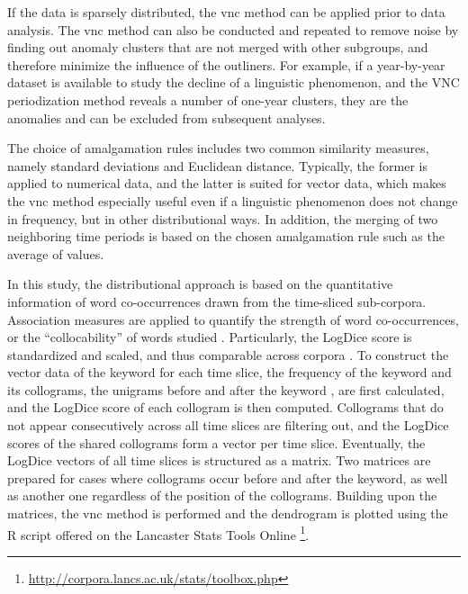 If the data is sparsely distributed, the \gls{vnc} method can be applied prior to data analysis. The \gls{vnc} method can also be conducted and repeated to remove noise by finding out anomaly clusters that are not merged with other subgroups, and therefore minimize the influence of the outliners. For example, if a year-by-year dataset is available to study the decline of a linguistic phenomenon, and the VNC periodization method reveals a number of one-year clusters, they are the anomalies and can be excluded from subsequent analyses.

The choice of amalgamation rules includes two common similarity measures, namely standard deviations and Euclidean distance. Typically, the former is applied to numerical data, and the latter is suited for vector data, which makes the \gls{vnc} method especially useful even if a linguistic phenomenon does not change in frequency, but in other distributional ways. In addition, the merging of two neighboring time periods is based on the chosen amalgamation rule such as the average of values.

In this study, the distributional approach is based on the quantitative information of word co-occurrences drawn from the time-sliced sub-corpora. Association measures are applied to quantify the strength of word co-occurrences, or the ``collocability'' of words studied \parencite{gablasova2017collocations}. Particularly, the LogDice score is standardized and scaled, and thus comparable across corpora \parencite{rychly2008lexicographer,gablasova2017collocations}. To construct the vector data of the keyword \jia for each time slice, the frequency of the keyword and its collograms, the unigrams before and after the keyword \parencite{gablasova2017collocations}, are first calculated, and the LogDice score of each collogram is then computed. Collograms that do not appear consecutively across all time slices are filtering out, and the LogDice scores of the shared collograms form a vector per time slice. Eventually, the LogDice vectors of all time slices is structured as a matrix. Two matrices are prepared for cases where collograms occur before and after the keyword, as well as another one regardless of the position of the collograms. Building upon the matrices, the \gls{vnc} method is performed and the dendrogram is plotted using the R script offered on the Lancaster Stats Tools Online \parencite{brezina2018statistics} \footnote{\url{http://corpora.lancs.ac.uk/stats/toolbox.php}}.

